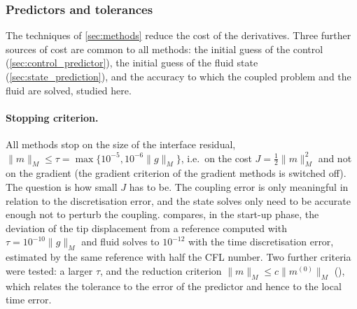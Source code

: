 \documentclass[11pt,a4paper]{article}
\theoremstyle{definition}
\theoremstyle{remark}
\newcommand{\M}{M}
\begin{document}
\subsubsection{Predictors and tolerances}\label{sec:fast_tolerances}

The techniques of \cref{sec:methods} reduce the cost of the derivatives. Three further sources of
cost are common to all methods: the initial guess of the control (\cref{sec:control_predictor}),
the initial guess of the fluid state (\cref{sec:state_prediction}), and the accuracy to which the
coupled problem and the fluid are solved, studied here.

\paragraph{Stopping criterion.} All methods stop on the size of the interface residual,
$\|m\|_{\M}\le\tau=\max\{10^{-5},10^{-6}\|g\|_{\M}\}$, i.e.\ on the cost $J=\frac12\|m\|_{\M}^2$ and
not on the gradient (the gradient criterion of the gradient methods is switched off). The question
is how small $J$ has to be. The coupling error is only meaningful in relation to the
discretisation error, and the state solves only need to be accurate enough not to perturb the
coupling.  compares, in the start-up phase, the deviation of the tip
displacement from a reference computed with $\tau=10^{-10}\|g\|_{\M}$ and fluid solves to
$10^{-12}$ with the time discretisation error, estimated by the same reference with half the CFL
number. Two further criteria were tested: a larger $\tau$, and the reduction criterion
$\|m\|_{\M}\le c\|m^{(0)}\|_{\M}$ (), which relates the tolerance to the
error of the predictor and hence to the local time error.
\end{document}
